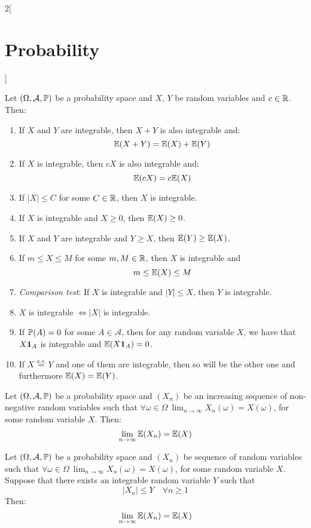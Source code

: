 \documentclass[../../../main.tex]{subfiles}
\begin{document}
\begin{multicols}{2}[\section{Probability}]
\begin{definition}[Expectation]
    \end{definition}
    \begin{prop}
        Let $(\Omega,\mathcal{A},\mathbb{P})$ be a probability space and $X$, $Y$ be random variables and $c\in\mathbb{R}$. Then:
        \begin{enumerate}
            \item If $X$ and $Y$ are integrable, then $X+Y$ is also integrable and: $$\mathbb{E}(X+Y)=\mathbb{E}(X)+\mathbb{E}(Y)$$
            \item If $X$ is integrable, then $cX$ is also integrable and: $$\mathbb{E}(cX)=c\mathbb{E}(X)$$
            \item If $|X|\leq C$ for some $C\in \mathbb{R}$, then $X$ is integrable.
            \item If $X$ is integrable and $X\geq 0$, then $\mathbb{E}(X)\geq 0$.
            \item If $X$ and $Y$ are integrable and $Y\geq X$, then $\mathbb{E}(Y)\geq \mathbb{E}(X)$.
            \item If $m\leq X\leq M$ for some $m, M\in\mathbb{R}$, then $X$ is integrable and $$m\leq \mathbb{E}(X)\leq M$$
            \item \textit{Comparison test}: If $X$ is integrable and $|Y|\leq X$, then $Y$ is integrable.
            \item $X$ is integrable $\iff |X|$ is integrable.
            \item If $\mathbb{P}(A)=0$ for some $A\in\mathcal{A}$, then for any random variable $X$, we have that $X\boldsymbol{\mathrm{1}}_A$ is integrable and $\mathbb{E}(X\boldsymbol{\mathrm{1}}_A)=0$.
            \item If $X\overset{a.s.}{=}Y$ and one of them are integrable, then so will be the other one and furthermore $\mathbb{E}(X)=\mathbb{E}(Y)$.
        \end{enumerate}
    \end{prop}
    \begin{theorem}
        Let $(\Omega,\mathcal{A},\mathbb{P})$ be a probability space and $(X_n)$ be an increasing sequence of non-negative random variables such that $\displaystyle\forall\omega\in\Omega\ \lim_{n\to\infty}X_n(\omega)=X(\omega)$, for some random variable $X$. Then: $$\lim_{n\to\infty} \mathbb{E}(X_n)=\mathbb{E}(X)$$
    \end{theorem}
    \begin{theorem}
        Let $(\Omega,\mathcal{A},\mathbb{P})$ be a probability space and $(X_n)$ be sequence of random variables such that $\displaystyle\forall\omega\in\Omega\ \lim_{n\to\infty}X_n(\omega)=X(\omega)$, for some random variable $X$. Suppose that there exists an integrable random variable $Y$ such that $$|X_n|\leq Y\quad\forall n\geq 1$$ Then: $$\lim_{n\to\infty} \mathbb{E}(X_n)=\mathbb{E}(X)$$
    \end{theorem}

\end{multicols}
\end{document}
